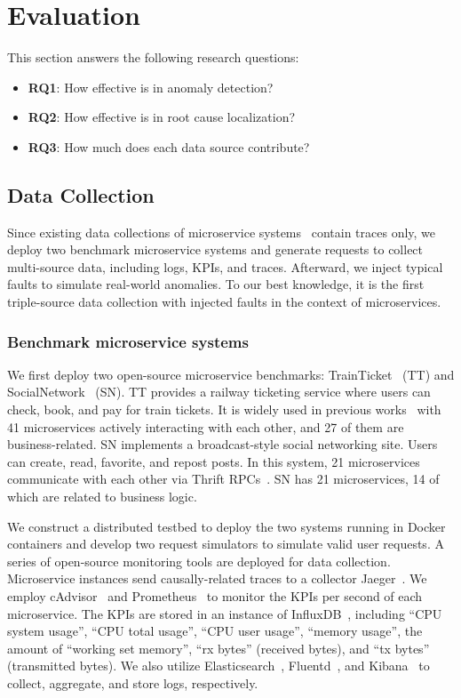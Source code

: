\section{Evaluation}
This section answers the following research questions:
\begin{itemize}[leftmargin=12pt, topsep=0pt]
    \item \textbf{RQ1}: How effective is \name in anomaly detection?
    \item \textbf{RQ2}: How effective is \name in root cause localization?
    \item \textbf{RQ3}: How much does each data source contribute?
\end{itemize}

\subsection{Data Collection}\label{sec:data}
Since existing data collections of microservice systems~\cite{AiopsChallenge20, TraceData20} contain traces only, we deploy two benchmark microservice systems and generate requests to collect multi-source data, including logs, KPIs, and traces.
Afterward, we inject typical faults to simulate real-world anomalies.
To our best knowledge, it is the first triple-source data collection 
 with injected faults in the context of microservices.

\subsubsection{Benchmark microservice systems}
We first deploy two open-source microservice benchmarks: TrainTicket~\cite{TrainTicket} (TT) and SocialNetwork~\cite{SocialNetwork} (SN).
TT provides a railway ticketing service where users can check, book, and pay for train tickets. It is widely used in previous works~\cite{MEPFL, TraceAnomaly} with 41 microservices actively interacting with each other, and 27 of them are business-related.
SN implements a broadcast-style social networking site. Users can create, read, favorite, and repost posts. In this system, 21 microservices communicate with each other via Thrift RPCs~\cite{Thrift}.
SN has 21 microservices, 14 of which are related to business logic. 
 
We construct a distributed testbed to deploy the two systems running in Docker containers and develop two request simulators to simulate valid user requests.
A series of open-source monitoring tools are deployed for data collection.
Microservice instances send causally-related traces to a collector Jaeger~\cite{Jaeger}.
We employ cAdvisor~\cite{cAdvisor} and Prometheus~\cite{Prometheus} to monitor the KPIs per second of each microservice.
The KPIs are stored in an instance of InfluxDB~\cite{Influxdb}, including ``CPU system usage'', ``CPU total usage'', ``CPU user usage'', ``memory usage'', the amount of ``working set memory'', ``rx bytes'' (received bytes), and ``tx bytes'' (transmitted bytes). 
We also utilize Elasticsearch~\cite{Elasticsearch}, Fluentd~\cite{Fluentd}, and Kibana~\cite{Kibana} to collect, aggregate, and store logs, respectively.

